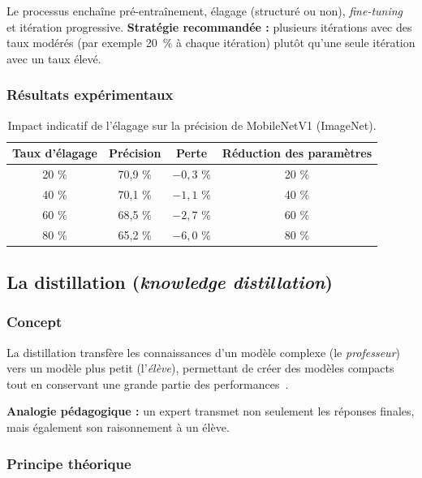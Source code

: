Le processus enchaîne pré-entraînement, élagage (structuré ou non),
\emph{fine-tuning} et itération progressive. \textbf{Stratégie
recommandée :} plusieurs itérations avec des taux modérés (par exemple 20~\% à
chaque itération) plutôt qu'une seule itération avec un taux élevé.

\subsubsection{Résultats expérimentaux}

\begin{table}[H]
\centering
\small
\begin{tabular}{cccc}
\toprule
Taux d'élagage & Précision & Perte & Réduction des paramètres \\
\midrule
20 \% & 70,9 \% & $-0{,}3$ \% & 20 \% \\
40 \% & 70,1 \% & $-1{,}1$ \% & 40 \% \\
60 \% & 68,5 \% & $-2{,}7$ \% & 60 \% \\
80 \% & 65,2 \% & $-6{,}0$ \% & 80 \% \\
\bottomrule
\end{tabular}
\caption{Impact indicatif de l'élagage sur la précision de MobileNetV1 (ImageNet).}
\label{tab:pruning}
\end{table}

\subsection{La distillation (\emph{knowledge distillation})}

\subsubsection{Concept}

La distillation transfère les connaissances d'un modèle complexe (le
\emph{professeur}) vers un modèle plus petit (l'\emph{élève}), permettant de
créer des modèles compacts tout en conservant une grande partie des
performances~\cite{hinton2015distilling}.

\textbf{Analogie pédagogique :} un expert transmet non seulement les réponses
finales, mais également son raisonnement à un élève.

\subsubsection{Principe théorique}

